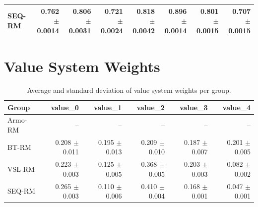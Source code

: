 \documentclass{article}
\begin{document}
\begin{table}[p]
\begin{tabular}{lrrrrrrr}
SEQ-RM & \makecell[r]{0.762 \\ $\pm$0.0014} & \makecell[r]{0.806 \\ $\pm$0.0031} & \makecell[r]{0.721 \\ $\pm$0.0024} & \makecell[r]{0.818 \\ $\pm$0.0042} & \makecell[r]{0.896 \\ $\pm$0.0014} & \makecell[r]{0.801 \\ $\pm$0.0015} & \makecell[r]{0.707 \\ $\pm$0.0015} \\
\bottomrule
\end{tabular}
\end{table}

\section*{Value System Weights}

\begin{table}[p]
\centering
\small
\caption{Average and standard deviation of value system weights per group.}
\label{tab:group-weights}
\begin{tabular}{lrrrrr}
\toprule
Group & value\_0 & value\_1 & value\_2 & value\_3 & value\_4 \\
\midrule
Armo-RM & -- & -- & -- & -- & -- \\
BT-RM & \makecell[r]{0.208 \\ $\pm$0.011} & \makecell[r]{0.195 \\ $\pm$0.013} & \makecell[r]{0.209 \\ $\pm$0.010} & \makecell[r]{0.187 \\ $\pm$0.007} & \makecell[r]{0.201 \\ $\pm$0.005} \\
VSL-RM & \makecell[r]{0.223 \\ $\pm$0.003} & \makecell[r]{0.125 \\ $\pm$0.005} & \makecell[r]{0.368 \\ $\pm$0.005} & \makecell[r]{0.203 \\ $\pm$0.003} & \makecell[r]{0.082 \\ $\pm$0.002} \\
SEQ-RM & \makecell[r]{0.265 \\ $\pm$0.003} & \makecell[r]{0.110 \\ $\pm$0.006} & \makecell[r]{0.410 \\ $\pm$0.004} & \makecell[r]{0.168 \\ $\pm$0.001} & \makecell[r]{0.047 \\ $\pm$0.001} \\
\bottomrule
\end{tabular}
\end{table}
\end{document}
